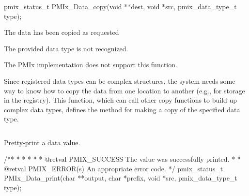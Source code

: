 \cspecificstart
\begin{codepar}
pmix_status_t
PMIx_Data_copy(void **dest, void *src,
               pmix_data_type_t type);
\end{codepar}
\cspecificend

\begin{arglist}
\end{arglist}

\begin{constantdesc}
\item {} The data has been copied as requested
\item {} The provided data type is not recognized.
\item {} The \ac{PMIx} implementation does not support this function.
\end{constantdesc}

\descr

Since registered data types can be complex structures, the system needs some way to know how to copy the data from one location to another (e.g., for storage in the registry). This function, which can call other copy functions to build up complex data types, defines the method for making a copy of the specified data type.


\subsection{}

\summary

Pretty-print a data value.

\format

\cspecificstart
\begin{codepar}
/**
 *
 *
 *
 *
 * @retval PMIX_SUCCESS The value was successfully printed.
 *
 * @retval PMIX_ERROR(s) An appropriate error code.
 */
pmix_status_t
PMIx_Data_print(char **output, char *prefix,
                void *src, pmix_data_type_t type);
\end{codepar}
\cspecificend

\begin{arglist}
\end{arglist}


